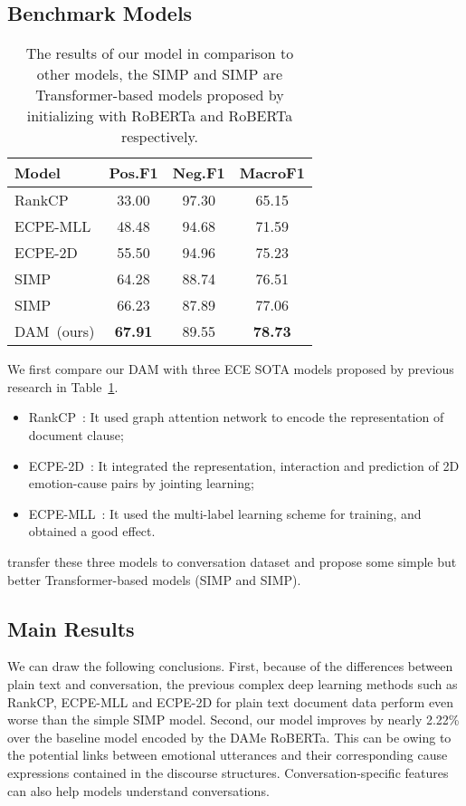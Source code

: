 \documentclass[11pt]{article}
\begin{document}
\subsection{Benchmark Models}
\begin{table}
    \centering
    \begin{tabular}{lccc}
            \toprule
            \textbf{Model}         & \textbf{Pos.F1}    & \textbf{Neg.F1}   & \textbf{MacroF1}  \\
            \midrule
            RankCP        & 33.00     & 97.30    & 65.15     \\
            ECPE-MLL      & 48.48     & 94.68    & 71.59     \\
            ECPE-2D       & 55.50     & 94.96    & 75.23     \\
            SIMP  & 64.28     & 88.74    & 76.51    \\
            SIMP & 66.23     & 87.89    & 77.06    \\
            \midrule
            DAM~(ours)   & {\bfseries 67.91}     & 89.55    & {\bfseries 78.73}     \\
            \bottomrule
    \end{tabular}
     \caption{The results of our model in comparison to other models, the SIMP and SIMP are Transformer-based models proposed by \citet{poria2021recognizing} initializing with RoBERTa and RoBERTa respectively.}
    \label{tab1}
\end{table}
We first compare our DAM with three ECE SOTA models proposed by previous research in Table~\ref{tab1}.
\begin{itemize}
\item[1.] RankCP~\cite{wei2020effective}: It used graph attention network to encode the representation of document clause;
\item[2.] ECPE-2D~\cite{ding2020ecpe}: It integrated the representation, interaction and prediction of 2D emotion-cause pairs by jointing learning;
\item[3.] ECPE-MLL~\cite{ding2020end}: It used the multi-label learning scheme for training, and obtained a good effect.
\end{itemize}
\citet{poria2021recognizing} transfer these three models to conversation dataset and propose some simple but better Transformer-based models (SIMP and SIMP). 

\subsection{Main Results}
We can draw the following conclusions. 
First, because of the differences between plain text and conversation, the previous complex deep learning methods such as RankCP, ECPE-MLL and ECPE-2D for plain text document data perform even worse than the simple SIMP model.
Second, our model improves by nearly 2.22\% over the baseline model encoded by the DAMe RoBERTa.
This can be owing to the potential links between emotional utterances and their corresponding cause expressions contained in the discourse structures. 
Conversation-specific features can also help models understand conversations.
\end{document}
